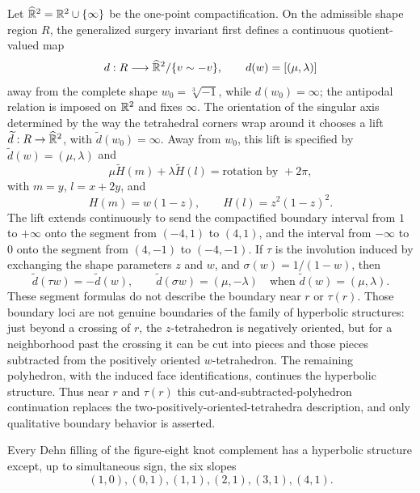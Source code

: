\begin{proposition}
\label{thurston-ch04-surgery-parameter-map}
Let \(\widehat{\mathbb{R}}^2=\mathbb{R}^2\cup\{\infty\}\) be the one-point compactification.  On the admissible shape region \(R\), the generalized surgery invariant first defines a continuous quotient-valued map
\[
 d:R\longrightarrow \widehat{\mathbb{R}}^2/\{v\sim-v\},
 \qquad d(w)=[(\mu,\lambda)]
\]
away from the complete shape \(w_0=\sqrt[3]{-1}\), while \(d(w_0)=\infty\); the antipodal relation is imposed on \(\mathbb{R}^2\) and fixes \(\infty\).  The orientation of the singular axis determined by the way the tetrahedral corners wrap around it chooses a lift \(\widetilde d:R\to\widehat{\mathbb{R}}^2\), with \(\widetilde d(w_0)=\infty\).  Away from \(w_0\), this lift is specified by \(\widetilde d(w)=(\mu,\lambda)\) and
\[
 \mu\widetilde H(m)+\lambda\widetilde H(l)=\text{rotation by }+2\pi,
\]
with \(m=y\), \(l=x+2y\), and
\[
 H(m)=w(1-z),\qquad H(l)=z^2(1-z)^2.
\]
The lift extends continuously to send the compactified boundary interval from \(1\) to \(+\infty\) onto the segment from \((-4,1)\) to \((4,1)\), and the interval from \(-\infty\) to \(0\) onto the segment from \((4,-1)\) to \((-4,-1)\).  If \(\tau\) is the involution induced by exchanging the shape parameters \(z\) and \(w\), and \(\sigma(w)=1/(1-w)\), then
\[
 \widetilde d(\tau w)=-\widetilde d(w),\qquad
 \widetilde d(\sigma w)=(\mu,-\lambda)
 \quad\text{when }\widetilde d(w)=(\mu,\lambda).
\]
These segment formulas do not describe the boundary near \(r\) or \(\tau(r)\).  Those boundary loci are not genuine boundaries of the family of hyperbolic structures: just beyond a crossing of \(r\), the \(z\)-tetrahedron is negatively oriented, but for a neighborhood past the crossing it can be cut into pieces and those pieces subtracted from the positively oriented \(w\)-tetrahedron.  The remaining polyhedron, with the induced face identifications, continues the hyperbolic structure.  Thus near \(r\) and \(\tau(r)\) this cut-and-subtracted-polyhedron continuation replaces the two-positively-oriented-tetrahedra description, and only qualitative boundary behavior is asserted.

\end{proposition}

\begin{theorem}
\label{thurston-ch04-hyperbolic-dehn-surgery-theorem}
Every Dehn filling of the figure-eight knot complement has a hyperbolic structure except, up to simultaneous sign, the six slopes
\[
 (1,0),(0,1),(1,1),(2,1),(3,1),(4,1).
\]

\end{theorem}

